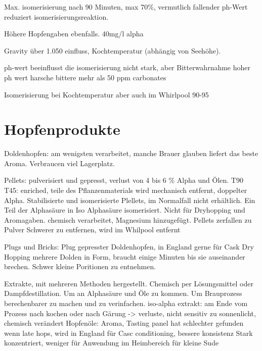 \documentclass[a4paper,parskip=half]{scrartcl}
\begin{document}
\parencite[128]{Garetz1994} 
Max. isomerisierung nach 90 Minuten, max 70\%, vermutlich fallender
ph-Wert reduziert isomerisierungsreaktion.

Höhere Hopfengaben ebenfalls. 40mg/l alpha 

\parencite[129]{Garetz1994} 
Gravity über 1.050 einfluss, Kochtemperatur (abhängig von Seehöhe).


\parencite[78]{Daniels1996}
ph-wert beeinflusst die isomerisierung nicht stark, aber Bitterwahrnahme
hoher ph wert harsche bittere mehr als 50 ppm carbonates

\parencite[49]{Holle2010} Isomerisierung bei Kochtemperatur
aber auch im Whirlpool 90-95


\section*{Hopfenprodukte}

\parencite[80\psq]{Garetz1994}
Doldenhopfen: am wenigsten verarbeitet, manche Brauer glauben
liefert das beste Aroma. Verbraucen viel Lagerplatz.

\parencite[82\psqq]{Garetz1994}
Pellets: pulverisiert und gepresst, verlust von 4 bis 6 \% Alpha
und Ölen.
T90
T45: enriched, teile des Pflanzenmaterials wird mechanisch
entfernt, doppelter Alpha.
Stabilisierte und isomerisierte Plellets, im Normalfall nicht
erhältlich. Ein Teil der Alphasäure in Iso Alphasäure
isomerisiert. Nicht für Dryhopping und Aromagaben.
chemisch verarbeitet, Magnesium hinzugefügt.
Pellets zerfallen zu Pulver
Schwerer zu entfernen, wird im Whilpool entfernt \parencite[87]{Garetz1994}

\parencite[84\psq]{Garetz1994}
Plugs und Bricks: 
Plug gepresster Doldenhopfen, in England gerne für Cask Dry Hopping
mehrere Dolden in Form, braucht einige Minuten bis sie auseinander
brechen. Schwer kleine Poritionen zu entnehmen.

\parencite[88-93]{Garetz1994}
Extrakte, mit mehreren Methoden hergestellt. Chemisch per Lösungsmittel
oder Dampfdestillation. Um an Alphasäure und Öle zu kommen.
Um Brauprozess berechenbarer zu machen und zu verinfachen.
iso-alpha extrakt: am Ende vom Prozess nach kochen oder
nach Gärung -> verluste, nicht sensitiv zu sonnenlicht, chemisch verändert
Hopfenöle: Aroma, Tasting panel hat schlechter gefunden wenn
late hops, wird in England für Casc conditioning, bessere konsistenz
Stark konzentriert, weniger für Anwendung im Heimbereich für
kleine Sude
\end{document}
